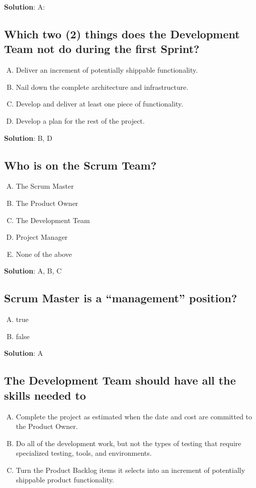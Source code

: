 \textbf{Solution}: A:


\subsection{Which two (2) things does the Development Team not do during the first Sprint?}
\begin{enumerate}[A)]
  \item Deliver an increment of potentially shippable functionality.
  \item Nail down the complete architecture and infrastructure.
  \item Develop and deliver at least one piece of functionality.
  \item Develop a plan for the rest of the project.
\end{enumerate}


\textbf{Solution}: B, D


\subsection{Who is on the Scrum Team?}

\begin{enumerate}[A)]
  \item The Scrum Master
  \item The Product Owner
  \item The Development Team
  \item Project Manager
  \item None of the above
\end{enumerate}


\textbf{Solution}: A, B, C


\subsection{Scrum Master is a \enquote{management} position?}
\begin{enumerate}[A)]
  \item true
  \item false
\end{enumerate}


\textbf{Solution}: A


\subsection{The Development Team should have all the skills needed to}
\begin{enumerate}[A)]
  \item Complete the project as estimated when the date and cost are committed to the Product Owner.
  \item Do all of the development work, but not the types of testing that require specialized testing, tools, and environments.
  \item Turn the Product Backlog items it selects into an increment of potentially shippable product functionality.
\end{enumerate}


